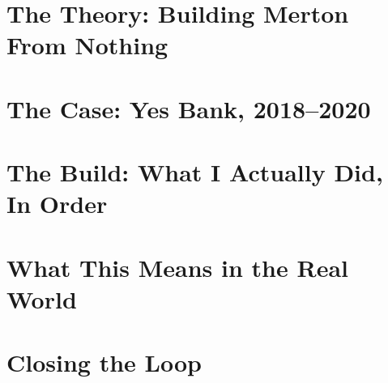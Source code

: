 \documentclass[11pt,a4paper]{article}
\begin{document}
\tableofcontents
\clearpage

\part{The Theory: Building Merton From Nothing}
\label{part:theory}


\part{The Case: Yes Bank, 2018--2020}
\label{part:case}


\part{The Build: What I Actually Did, In Order}
\label{part:build}


\part{What This Means in the Real World}
\label{part:realworld}


\part{Closing the Loop}
\label{part:close}

\end{document}
